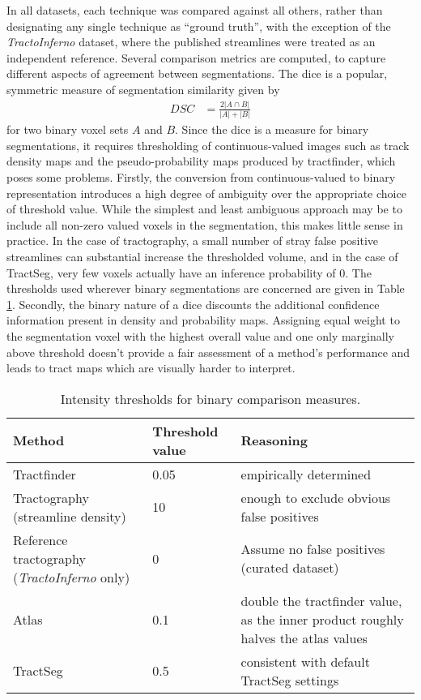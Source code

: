 In all datasets, each technique was compared against all others, rather than designating any single technique as ``ground truth'', with the exception of the \textit{TractoInferno} dataset, where the published streamlines were treated as an independent reference.
Several comparison metrics are computed, to capture different aspects of agreement between segmentations.
The \gls{dice} \autocite{Dice1945} is a popular, symmetric measure of segmentation similarity given by
%
\begin{align}
  DSC &= \frac{2 |A \cap B|}{|A| + |B|}
\end{align}
%
for two binary voxel sets $A$ and $B$.
Since the \gls{dice} is a measure for binary segmentations, it requires thresholding of continuous-valued images such as track density maps and the pseudo-probability maps produced by tractfinder, which poses some problems.
Firstly, the conversion from continuous-valued to binary representation introduces a high degree of ambiguity over the appropriate choice of threshold value.
While the simplest and least ambiguous approach may be to include all non-zero valued voxels in the segmentation, this makes little sense in practice.
In the case of tractography, a small number of stray false positive streamlines can substantial increase the thresholded volume, and in the case of TractSeg, very few voxels actually have an inference probability of 0.
The thresholds used wherever binary segmentations are concerned are given in Table \ref{tab:thresh}.
Secondly, the binary nature of a \gls{dice} discounts the additional confidence information present in density and probability maps.
Assigning equal weight to the segmentation voxel with the highest overall value and one only marginally above threshold doesn't provide a fair assessment of a method's performance and leads to tract maps which are visually harder to interpret.

\begin{table}[h!]
  \caption{Intensity thresholds for binary comparison measures.}
  \label{tab:thresh}
  \small
  \begin{tabularx}{\textwidth}{>{\raggedright\arraybackslash}X l >{\raggedright\arraybackslash}X}
    \toprule
    Method    & Threshold value & Reasoning \\
    \midrule
    Tractfinder   & 0.05 & empirically determined \\
    Tractography (streamline density) & 10 & enough to exclude obvious false positives \\
    Reference tractography (\textit{TractoInferno} only) & 0 & Assume no false positives (curated dataset) \\
    Atlas         & 0.1 & double the tractfinder value, as the inner product roughly halves the atlas values \\
    TractSeg      & 0.5 & consistent with default TractSeg settings \\ \bottomrule
  \end{tabularx}
\end{table}

